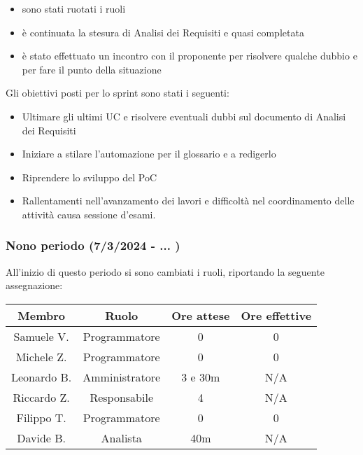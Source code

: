 \begin{itemize}
    \item sono stati ruotati i ruoli
    \item è continuata la stesura di Analisi dei Requisiti e quasi completata
    \item è stato effettuato un incontro con il proponente per risolvere qualche dubbio e per fare il punto della situazione
\end{itemize}

Gli obiettivi posti per lo sprint sono stati i seguenti:
\begin{itemize}
    \item Ultimare gli ultimi UC e risolvere eventuali dubbi sul documento di Analisi dei Requisiti
    \item Iniziare a stilare l'automazione per il glossario e a redigerlo
    \item Riprendere lo sviluppo del PoC
\end{itemize}

\begin{itemize}
    \item Rallentamenti nell'avanzamento dei lavori e difficoltà nel coordinamento delle attività causa sessione d'esami.
\end{itemize}


\subsubsection{Nono periodo (7/3/2024 - ... )}
All'inizio di questo periodo si sono cambiati i ruoli, riportando la seguente assegnazione:

\vspace{10 mm}
\begin{tabular}{|c|c|c|c|}
\hline
\textbf{Membro} & \textbf{Ruolo} & \textbf{Ore attese} & \textbf{Ore effettive} \\
\hline
Samuele V. & Programmatore & 0 & 0 \\
\hline
Michele Z. & Programmatore & 0 & 0 \\
\hline
Leonardo B. & Amministratore & 3 e 30m & N/A \\
\hline
Riccardo Z. & Responsabile & 4 & N/A \\
\hline
Filippo T. & Programmatore & 0 & 0 \\
\hline
Davide B. & Analista & 40m & N/A \\
\hline
\end{tabular}
\vspace{10 mm}

